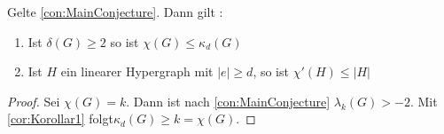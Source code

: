 \begin{theorem}
  \label{thm:MainTheorem}
  Gelte \ref{con:MainConjecture}. Dann gilt :
  \begin{enumerate}[label=(\roman*)]
    \item Ist $\delta\left( G \right) \geq 2$ so ist $\chi\left( G \right)\leq \kappa_{d}\left( G \right)$
    \item  Ist $H$ ein linearer Hypergraph mit $\left|e\right| \geq d$, so ist $\chi'\left( H \right)\leq \left|H\right| $
  \end{enumerate}
\end{theorem}

\begin{proof}
  Sei $\chi(G) = k$. Dann ist nach \ref{con:MainConjecture} $\lambda_{k}\left( G \right) > -2$. Mit \ref{cor:Korollar1} folgt$\kappa_{d}\left( G \right) \geq k = \chi\left( G \right)$.
\end{proof}
